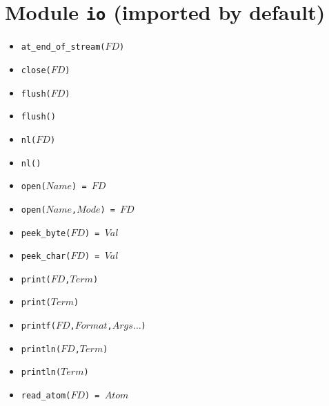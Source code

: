 \documentclass[10pt]{article}
\begin{document}
\begin{multicols}{2}
\begin{scriptsize}
\begin{itemize}
\end{itemize}
\end{scriptsize}

\section*{Module \texttt{io} (imported by default)}
\begin{scriptsize}
\begin{itemize}
   \item \texttt{at\_end\_of\_stream($FD$)}
   \item \texttt{close($FD$)}
   \item \texttt{flush($FD$)}
   \item \texttt{flush()}
   \item \texttt{nl($FD$)}
   \item \texttt{nl()}
   \item \texttt{open($Name$) = $FD$}
   \item \texttt{open($Name$,$Mode$) = $FD$}
   \item \texttt{peek\_byte($FD$) = $Val$}
   \item \texttt{peek\_char($FD$) = $Val$}
   \item \texttt{print($FD$,$Term$)}
   \item \texttt{print($Term$)}
   \item \texttt{printf($FD$,$Format$,$Args\ldots$)}
   \item \texttt{println($FD$,$Term$)}
   \item \texttt{println($Term$)}
   \item \texttt{read\_atom($FD$) = $Atom$}

\end{itemize}
\end{scriptsize}
\end{multicols}
\end{document}

